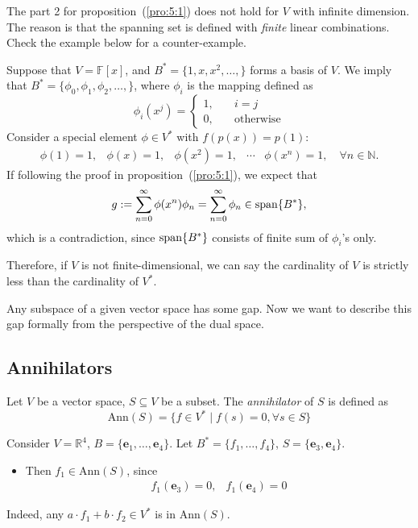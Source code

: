 \begin{remark}
The part 2 for proposition~(\ref{pro:5:1}) does not hold for $V$ with infinite dimension. The reason is that the spanning set is defined with \emph{finite} linear combinations. Check the example below for a counter-example.
\end{remark}



\begin{example}
Suppose that $V=\mathbb{F}[x]$, and $B^* = \{1,x,x^2,\dots,\}$ forms a basis of $V$. 
We imply that $B^*=\{\phi_0,\phi_1,\phi_2,\dots,\}$, where $\phi_i$ is the mapping defined as
\[
\phi_i(x^j) = \left\{
\begin{aligned}
1,&\quad i=j\\
0,&\quad\text{otherwise}
\end{aligned}
\right.
\]
Consider a special element $\phi\in V^*$ with $f(p(x)) = p(1)$:
\[
\begin{array}{lllll}
\phi(1)=1,&\phi(x)=1,&\phi(x^2)=1,&\cdots&\phi(x^n)=1,\quad\forall n\in\mathbb{N}.
\end{array}
\]
If following the proof in proposition~(\ref{pro:5:1}), we expect that 
\[
g := \sum_{n=0}^\infty \phi(x^n)\phi_n = \sum_{n=0}^\infty \phi_n\in\operatorname{span}\{B^*\},
\]
which is a contradiction, since $\operatorname{span}\{B^*\}$ consists of finite sum of $\phi_i$'s only.
\end{example}
\begin{remark}
Therefore, if $V$ is not finite-dimensional, we can say the cardinality of $V$ is strictly less than the cardinality of $V^*$.
\end{remark}

Any subspace of a given vector space has some gap. Now we want to describe this gap formally from the perspective of the dual space.

\subsection{Annihilators}
\begin{definition}
Let $V$ be a vector space, $S\subseteq V$ be a subset.
The \emph{annihilator} of $S$ is defined as
\[
\text{Ann}(S) = \{f\in V^*\mid f(s) = 0,\forall s\in S\}
\]
\end{definition}
\begin{example}
Consider $V=\mathbb{R}^4$, $B=\{\bm e_1,\dots,\bm e_4\}$. 
Let $B^*=\{f_1,\dots,f_4\}$, $S=\{\bm e_3,\bm e_4\}$. 
\begin{itemize}
\item
Then $f_1\in\text{Ann}(S)$, since
\[
\begin{array}{ll}
f_1(\bm e_3) = 0,
&
f_1(\bm e_4)=0
\end{array}
\]
\end{itemize}
Indeed, any $a\cdot f_1+b\cdot f_2\in V^*$ is in $\text{Ann}(S)$.
\end{example}

